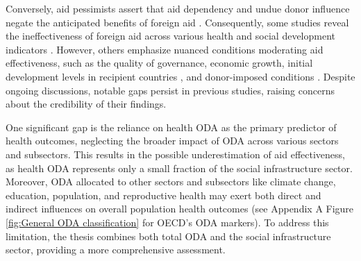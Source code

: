 Conversely, aid pessimists assert that aid dependency and undue donor influence negate the anticipated benefits of foreign aid \parencite{easterly_are_2007}. Consequently, some studies reveal the ineffectiveness of foreign aid across various health and social development indicators \parencite{ali_foreign_2020, chung_economic_2022, williamson_foreign_2008}. However, others emphasize nuanced conditions moderating aid effectiveness, such as the quality of governance, economic growth, initial development levels in recipient countries \parencite{kavanagh_governance_2019, ogbuoji_aid_2018, shafa_assessment_2023}, and donor-imposed conditions \parencite{nwude_impact_2023}. Despite ongoing discussions, notable gaps persist in previous studies, raising concerns about the credibility of their findings. 

One significant gap is the reliance on health ODA as the primary predictor of health outcomes, neglecting the broader impact of ODA across various sectors and subsectors. This results in the possible underestimation of aid effectiveness, as health ODA represents only a small fraction of the social infrastructure sector.  Moreover, ODA allocated to other sectors and subsectors like climate change, education, population, and reproductive health may exert both direct and indirect influences on overall population health outcomes (see Appendix A Figure \ref{fig:General ODA classification} for OECD's ODA markers). To address this limitation, the thesis combines both total ODA and the social infrastructure sector, providing a more comprehensive assessment. 


